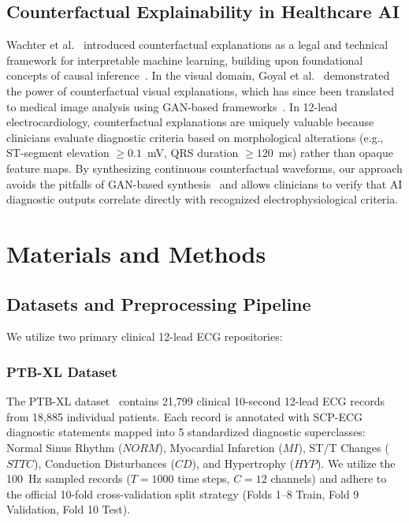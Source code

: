 \documentclass[12pt]{elsarticle}
\begin{document}
\subsection{Counterfactual Explainability in Healthcare AI}
Wachter et al.~\cite{wachter2017counterfactual} introduced counterfactual explanations as a legal and technical framework for interpretable machine learning, building upon foundational concepts of causal inference~\cite{pearl2009causality}. In the visual domain, Goyal et al.~\cite{goyal2019counterfactual} demonstrated the power of counterfactual visual explanations, which has since been translated to medical image analysis using GAN-based frameworks~\cite{mertes2022gan, mothilal2020explaining}. In 12-lead electrocardiology, counterfactual explanations are uniquely valuable because clinicians evaluate diagnostic criteria based on morphological alterations (e.g., ST-segment elevation $\ge 0.1$~mV, QRS duration $\ge 120$~ms) rather than opaque feature maps. By synthesizing continuous counterfactual waveforms, our approach avoids the pitfalls of GAN-based synthesis~\cite{korkmaz2021deep} and allows clinicians to verify that AI diagnostic outputs correlate directly with recognized electrophysiological criteria.

\section{Materials and Methods}
\label{sec:methods}

\subsection{Datasets and Preprocessing Pipeline}
We utilize two primary clinical 12-lead ECG repositories:

\subsubsection{PTB-XL Dataset}
The PTB-XL dataset~\cite{wagner2020ptb} contains 21,799 clinical 10-second 12-lead ECG records from 18,885 individual patients. Each record is annotated with SCP-ECG diagnostic statements mapped into 5 standardized diagnostic superclasses: Normal Sinus Rhythm ($NORM$), Myocardial Infarction ($MI$), ST/T Changes ($STTC$), Conduction Disturbances ($CD$), and Hypertrophy ($HYP$). We utilize the 100~Hz sampled records ($T = 1000$ time steps, $C = 12$ channels) and adhere to the official 10-fold cross-validation split strategy (Folds 1--8 Train, Fold 9 Validation, Fold 10 Test).
\end{document}
